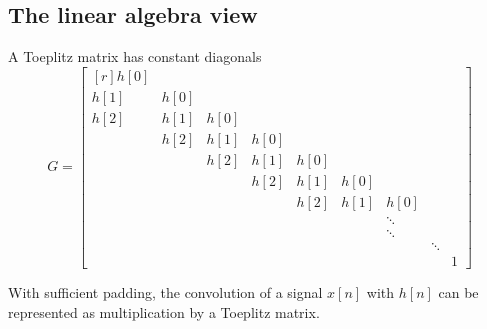 \subsection{The linear algebra view}
A Toeplitz matrix has constant diagonals
\[ %
 G = 
 \begin{bmatrix*}[r]
    h[0] \\
    h[1] &h[0]\\
    h[2] &h[1] & h[0]\\
    &h[2] &h[1] & h[0]\\
    &&h[2] &h[1] & h[0]\\
    &&&h[2] &h[1] & h[0]\\
    &&&&h[2] &h[1] & h[0]\\
    &&&&&&\ddots\\
    &&&&&&\ddots\\
    &&&&&&&\ddots\\
    &&&&&&&&1
  \end{bmatrix*}
\]

With sufficient padding, the convolution of a signal $x[n]$ with
$h[n]$ can be represented as multiplication by a Toeplitz matrix. 


